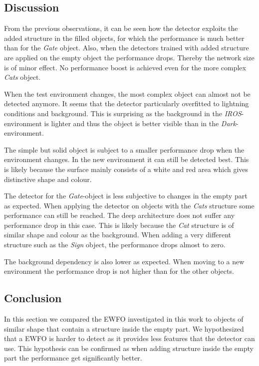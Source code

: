 \subsection{Discussion}

From the previous observations, it can be seen how the detector exploits the added structure in the filled objects, for which the performance is much better than for the \textit{Gate} object. Also, when the detectors trained with added structure are applied on the empty object the performance drops. Thereby the network size is of minor effect. No performance boost is achieved even for the more complex \textit{Cats} object.

When the test environment changes, the most complex object can almost not be detected anymore. It seems that the detector particularly overfitted to lightning conditions and background. This is surprising as the background in the \textit{IROS}-environment is lighter and thus the object is better visible than in the \textit{Dark}-environment.

The simple but solid object is subject to a smaller performance drop when the environment changes. In the new environment it can still be detected best. This is likely because the surface mainly consists of a white and red area which gives distinctive shape and colour.

The detector for the \textit{Gate}-object is less subjective to changes in the empty part as expected. When applying the detector on objects with the \textit{Cats} structure some performance can still be reached. The deep architecture does not suffer any performance drop in this case. This is likely because the \textit{Cat} structure is of similar shape and colour as the background. When adding a very different structure such as the \textit{Sign} object, the performance drops almost to zero.

The background dependency is also lower as expected. When moving to a new environment the performance drop is not higher than for the other objects.


\subsection{Conclusion}

In this section we compared the \ac{EWFO} investigated in this work to objects of similar shape that contain a structure inside the empty part. We hypothesized that a \ac{EWFO} is harder to detect as it provides less features that the detector can use. This hypothesis can be confirmed as when adding structure inside the empty part the performance get significantly better. 

